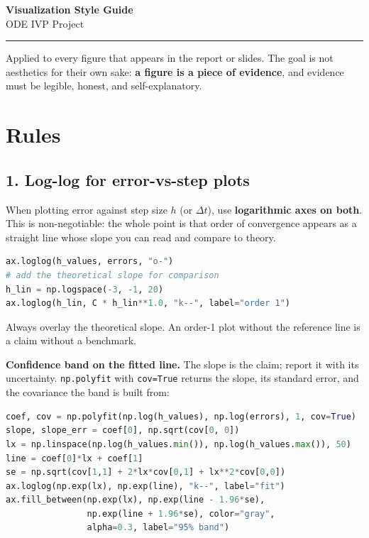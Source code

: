 \documentclass[11pt]{article}
\begin{document}
\begin{center}
  {\LARGE\bfseries Visualization Style Guide}\\[0.4em]
  {\large ODE IVP Project}
\end{center}
\vspace{0.2em}
\hrule
\vspace{0.6em}

Applied to every figure that appears in the report or slides. The goal is not
aesthetics for their own sake: \textbf{a figure is a piece of evidence}, and
evidence must be legible, honest, and self-explanatory.

\section*{Rules}

\subsection*{1. Log-log for error-vs-step plots}
When plotting error against step size $h$ (or $\Delta t$), use \textbf{logarithmic
axes on both}. This is non-negotiable: the whole point is that order of
convergence appears as a straight line whose slope you can read and compare to
theory.

\begin{lstlisting}[language=Python]
ax.loglog(h_values, errors, "o-")
# add the theoretical slope for comparison
h_lin = np.logspace(-3, -1, 20)
ax.loglog(h_lin, C * h_lin**1.0, "k--", label="order 1")
\end{lstlisting}
Always overlay the theoretical slope. An order-1 plot without the reference line
is a claim without a benchmark.

\textbf{Confidence band on the fitted line.} The slope is the claim; report it
with its uncertainty. \texttt{np.polyfit} with \texttt{cov=True} returns the
slope, its standard error, and the covariance the band is built from:

\begin{lstlisting}[language=Python]
coef, cov = np.polyfit(np.log(h_values), np.log(errors), 1, cov=True)
slope, slope_err = coef[0], np.sqrt(cov[0, 0])
lx = np.linspace(np.log(h_values.min()), np.log(h_values.max()), 50)
line = coef[0]*lx + coef[1]
se = np.sqrt(cov[1,1] + 2*lx*cov[0,1] + lx**2*cov[0,0])
ax.loglog(np.exp(lx), np.exp(line), "k--", label="fit")
ax.fill_between(np.exp(lx), np.exp(line - 1.96*se),
                np.exp(line + 1.96*se), color="gray",
                alpha=0.3, label="95% band")
\end{lstlisting}
\end{document}

